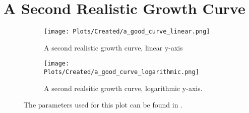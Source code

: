 \section{A Second Realistic Growth Curve}
\label{sec:appendixE:a_good_curve_2}

\begin{figure}[H]
    \centering
    \begin{subfigure}{1\linewidth}
        \centering
        \captionsetup{width=1\linewidth}
        \texttt{[image: Plots/Created/a\_good\_curve\_linear.png]}
        \caption{
            A second realistic growth curve, linear y-axis
        }
        \label{fig:created:a_good_curve_linear_2}
    \end{subfigure}
    \hfill
    \begin{subfigure}{1\linewidth}
        \centering
        \captionsetup{width=1\linewidth}
        \texttt{[image: Plots/Created/a\_good\_curve\_logarithmic.png]}
        \caption{
            A second realsitic growth curve, logarithmic y-axis. 
        }
        \label{fig:created:a_good_curve_logarithmic_2}
    \end{subfigure}
    \caption{
        The parameters used for this plot can be found in . 
    }
    \label{fig:created:a_good_curve_2}
\end{figure}

